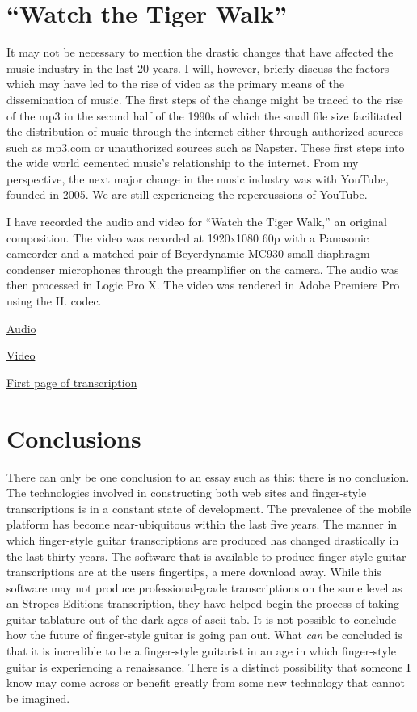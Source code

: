 \documentclass[unicode,hyperfootnotes=false,xetex,colorlinks=true,nofonts,nobib]{tufte-handout}
\begin{document}
\section{``Watch the Tiger Walk''}
\label{sec:watch-tiger-walk}

It may not be necessary to mention the drastic changes that have
affected the music industry in the last 20 years. I will, however,
briefly discuss the factors which may have led to the rise of video as
the primary means of the dissemination of music. The first steps of
the change might be traced to the rise of the mp3 in the second half
of the 1990s of which the small file size facilitated the distribution
of music through the internet either through authorized sources such
as mp3.com or unauthorized sources such as Napster. These first steps
into the wide world cemented music's relationship to the
internet. From my perspective, the next major change in the music
industry was with YouTube, founded in 2005. We are still experiencing
the repercussions of YouTube.

I have recorded the audio and video for ``Watch the Tiger Walk,'' an
original composition. The video was recorded at {\numberfont1920x1080
  60p} with a Panasonic camcorder and a matched pair of Beyerdynamic
{\numberfont MC930} small diaphragm condenser microphones through the
preamplifier on the camera. The audio was then processed in Logic Pro
X. The video was rendered in Adobe Premiere Pro using the
H. {} codec.

\noindent \href{run:watchTheTigerWalk20170412.wav}{Audio}

\noindent\href{run:watchTheTigerWalk20170412.mp4}{Video}

\noindent\href{run:watchTheTigerWalk20170413.pdf}{First page of transcription}

\section{Conclusions}
\label{sec:conclusions}

There can only be one conclusion to an essay such as this: there is no
conclusion. The technologies involved in constructing both web sites
and finger-style transcriptions is in a constant state of
development. The prevalence of the mobile platform has become
near-ubiquitous within the last five years. The manner in which
finger-style guitar transcriptions are produced has changed
drastically in the last thirty years. The software that is available
to produce finger-style guitar transcriptions are at the users
fingertips, a mere download away. While this software may not produce
professional-grade transcriptions on the same level as an Stropes
Editions transcription, they have helped begin the process of taking
guitar tablature out of the dark ages of ascii-tab. It is not possible
to conclude how the future of finger-style guitar is going pan
out. What \emph{can} be concluded is that it is incredible to be a
finger-style guitarist in an age in which finger-style guitar is
experiencing a renaissance. There is a distinct possibility that
someone I know may come across or benefit greatly from some new
technology that cannot be imagined.
\end{document}
